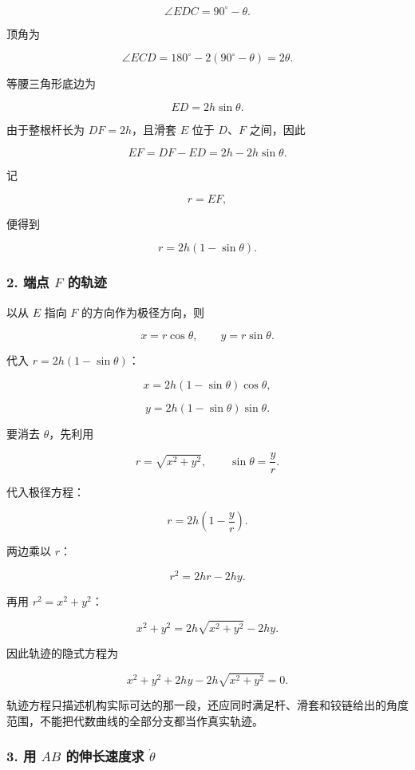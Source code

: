 \documentclass[12pt,a4paper,UTF8]{ctexart}
\begin{document}
\[
\angle EDC=90^\circ-\theta.
\]

顶角为

\[
\angle ECD=180^\circ-2(90^\circ-\theta)=2\theta.
\]

等腰三角形底边为

\[
ED=2h\sin\theta.
\]

由于整根杆长为 \(DF=2h\)，且滑套 \(E\) 位于 \(D\)、\(F\) 之间，因此

\[
EF=DF-ED=2h-2h\sin\theta.
\]

记

\[
r=EF,
\]

便得到

\[
\boxed{r=2h(1-\sin\theta)}.
\]

\subsubsection{\texorpdfstring{2. 端点 \(F\)
的轨迹}{2. 端点 F 的轨迹}}\label{ux7aefux70b9-f-ux7684ux8f68ux8ff9}

以从 \(E\) 指向 \(F\) 的方向作为极径方向，则

\[
x=r\cos\theta,
\qquad
y=r\sin\theta.
\]

代入 \(r=2h(1-\sin\theta)\)：

\[
x=2h(1-\sin\theta)\cos\theta,
\]

\[
y=2h(1-\sin\theta)\sin\theta.
\]

要消去 \(\theta\)，先利用

\[
r=\sqrt{x^2+y^2},
\qquad
\sin\theta=\frac{y}{r}.
\]

代入极径方程：

\[
r=2h\left(1-\frac{y}{r}\right).
\]

两边乘以 \(r\)：

\[
r^2=2hr-2hy.
\]

再用 \(r^2=x^2+y^2\)：

\[
x^2+y^2=2h\sqrt{x^2+y^2}-2hy.
\]

因此轨迹的隐式方程为

\[
\boxed{
x^2+y^2+2hy-2h\sqrt{x^2+y^2}=0
}.
\]

轨迹方程只描述机构实际可达的那一段，还应同时满足杆、滑套和铰链给出的角度范围，不能把代数曲线的全部分支都当作真实轨迹。

\subsubsection{\texorpdfstring{3. 用 \(AB\) 的伸长速度求
\(\dot\theta\)}{3. 用 AB 的伸长速度求 \textbackslash dot\textbackslash theta}}\label{ux7528-ab-ux7684ux4f38ux957fux901fux5ea6ux6c42-dottheta}
\end{document}
